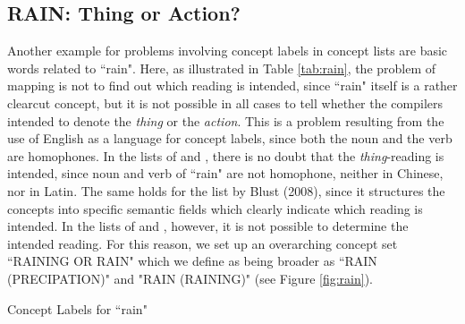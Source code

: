 \documentclass[10pt, a4paper]{article}
\begin{document}
\subsection{RAIN: Thing or Action?}
Another example for problems involving concept labels in concept lists are basic words related to
``rain". Here, as illustrated in Table \ref{tab:rain}, the problem of mapping is not to find out which reading is intended, since ``rain"
itself is a rather clearcut concept, but it is not possible in all cases to tell whether the
compilers intended to denote the \emph{thing} or the \emph{action}. This is a problem resulting from
the use of English as a language for concept labels, since both the noun and the verb are
homophones. In the lists of  and , there is no doubt that the
\emph{thing}-reading is intended, since noun and verb of ``rain" are not homophone, neither in
Chinese, nor in Latin. The same holds for the list by Blust (2008), since it structures the concepts
into specific semantic fields which clearly indicate which reading is intended. In the lists of
 and , however, it is not possible to determine the
intended reading. For this reason, we set up an overarching concept set ``RAINING OR RAIN" which we define as
being broader as ``RAIN (PRECIPATION)" and "RAIN (RAINING)" (see Figure \ref{fig:rain}).

\begin{table}[h]
    \caption{Concept Labels for ``rain"}
    \label{tab:rain}
  \end{table}
\end{document}
